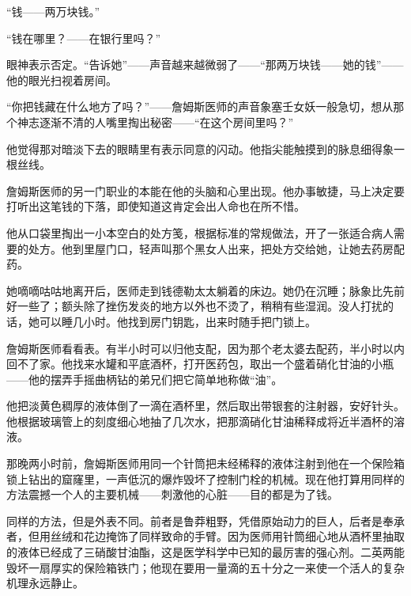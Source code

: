 \documentclass{article}
\begin{document}
“钱——两万块钱。”



“钱在哪里？——在银行里吗？”



眼神表示否定。“告诉她”——声音越来越微弱了——“那两万块钱——她的钱”——他的眼光扫视着房间。



“你把钱藏在什么地方了吗？”——詹姆斯医师的声音象塞壬女妖一般急切，想从那个神志逐渐不清的人嘴里掏出秘密——“在这个房间里吗？”



他觉得那对暗淡下去的眼睛里有表示同意的闪动。他指尖能触摸到的脉息细得象一根丝线。



詹姆斯医师的另一门职业的本能在他的头脑和心里出现。他办事敏捷，马上决定要打听出这笔钱的下落，即使知道这肯定会出人命也在所不惜。



他从口袋里掏出一小本空白的处方笺，根据标准的常规做法，开了一张适合病人需要的处方。他到里屋门口，轻声叫那个黑女人出来，把处方交给她，让她去药房配药。



她嘀嘀咕咕地离开后，医师走到钱德勒太太躺着的床边。她仍在沉睡；脉象比先前好一些了；额头除了挫伤发炎的地方以外也不烫了，稍稍有些湿润。没人打扰的话，她可以睡几小时。他找到房门钥匙，出来时随手把门锁上。



詹姆斯医师看看表。有半小时可以归他支配，因为那个老太婆去配药，半小时以内回不了家。他找来水罐和平底酒杯，打开医药包，取出一个盛着硝化甘油的小瓶——他的摆弄手摇曲柄钻的弟兄们把它简单地称做“油”。



他把淡黄色稠厚的液体倒了一滴在酒杯里，然后取出带银套的注射器，安好针头。他根据玻璃管上的刻度细心地抽了几次水，把那滴硝化甘油稀释成将近半酒杯的溶液。



那晚两小时前，詹姆斯医师用同一个针筒把未经稀释的液体注射到他在一个保险箱锁上钻出的窟窿里，一声低沉的爆炸毁坏了控制门栓的机械。现在他打算用同样的方法震撼一个人的主要机械——刺激他的心脏——目的都是为了钱。



同样的方法，但是外表不同。前者是鲁莽粗野，凭借原始动力的巨人，后者是奉承者，但用丝绒和花边掩饰了同样致命的手臂。因为医师用针筒细心地从酒杯里抽取的液体已经成了三硝酸甘油酯，这是医学科学中已知的最厉害的强心剂。二英两能毁坏一扇厚实的保险箱铁门；他现在要用一量滴的五十分之一来使一个活人的复杂机理永远静止。
\end{document}
